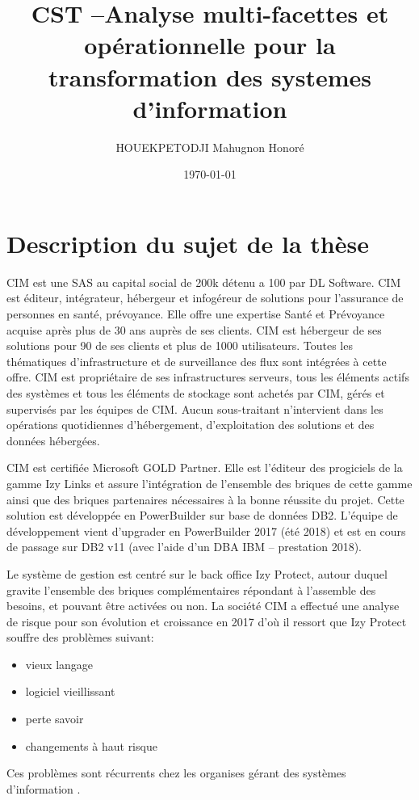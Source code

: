 \documentclass[a4paper]{article}
\title{CST --Analyse multi-facettes et opérationnelle pour la transformation des systemes d’information}
\author{ HOUEKPETODJI Mahugnon Honoré}
\begin{document}
\institution{}

\date{\today}

\maketitle


\section{Description du sujet de la thèse}
CIM est une SAS au capital social de 200k détenu a 100 par DL Software. 
CIM est éditeur, intégrateur, hébergeur et infogéreur de solutions pour l'assurance de personnes en santé, prévoyance. 
Elle offre une expertise Santé et Prévoyance acquise après
plus de 30 ans auprès de ses clients. 
CIM est hébergeur de ses solutions pour 90 de ses clients et plus de 1000 utilisateurs. 
Toutes les thématiques d'infrastructure et de surveillance des flux sont intégrées à cette offre.
CIM est propriétaire de ses infrastructures serveurs, tous les éléments actifs des systèmes et tous les éléments de stockage sont achetés par CIM, gérés et supervisés par les équipes de CIM. Aucun sous-traitant n'intervient dans les opérations quotidiennes d'hébergement, d'exploitation des solutions et des données hébergées.

CIM est certifiée Microsoft GOLD Partner. 
Elle est l'éditeur des progiciels de la gamme Izy Links et assure l'intégration de l'ensemble des briques de cette gamme ainsi que des briques partenaires nécessaires à la bonne réussite du projet. Cette solution est développée en PowerBuilder sur base de données DB2. L'équipe de développement
vient d'upgrader en PowerBuilder 2017 (été 2018) et est en cours de passage sur DB2 v11 (avec l'aide d'un DBA IBM – prestation 2018).

Le système de gestion est centré sur le back office Izy Protect, autour duquel gravite
l’ensemble des briques complémentaires répondant à l'assemble des besoins, et pouvant
être activées ou non. 
La société CIM a effectué une analyse de risque pour son évolution et croissance en 2017 d'où il ressort que Izy Protect souffre des problèmes suivant:
\begin{itemize}
\item vieux langage  
\item logiciel vieillissant
\item perte savoir
\item changements à haut risque 
\end{itemize}
Ces problèmes sont récurrents chez les organises gérant des systèmes d'information \cite{Deme02a}.
\end{document}
